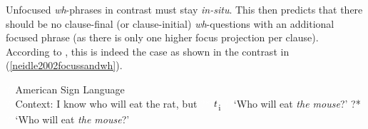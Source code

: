 
\noindent Unfocused \textit{wh}-phrases in contrast must stay \textit{in-situ}. This then predicts that there should be no clause-final (or clause-initial) \textit{wh}-questions with an additional focused phrase (as there is only one higher focus projection per clause). According to \citet[83]{neidle2002language}, this is indeed the case as shown in the contrast in (\ref{neidle2002focussandwh}).

\begin{exe}
\ex\label{neidle2002focussandwh}\begin{xlist} 
\sn \textcolor{white}{?*}American Sign Language \citep[83]{neidle2002language}  \\ \textcolor{white}{?*}Context: I know who will eat the rat, but
\ex \textcolor{white}{?*}  $\textrm{\textit{t}}$\textsubscript{i}
\glt \textcolor{white}{?*}`Who will eat \textit{the mouse}?' \label{ex:neidle2002focussandwha} 
\ex ?* 
\glt \textcolor{white}{?*}`Who will eat \textit{the mouse}?' \label{ex:neidle2002focussandwhb} 
\end{xlist}
\end{exe}



